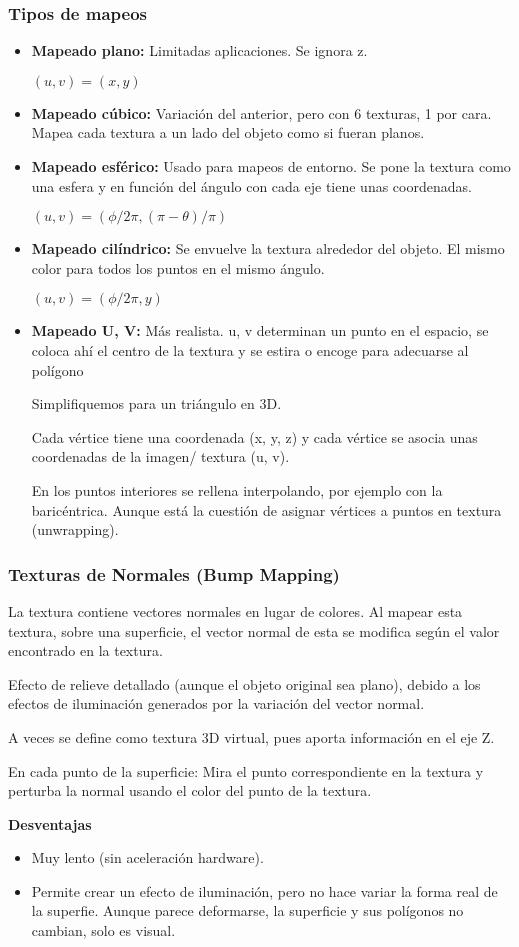 \subsubsection{Tipos de mapeos}
\begin{itemize}
    \item \textbf{Mapeado plano:} Limitadas aplicaciones. Se ignora z. 
    
    $(u, v)=(x, y)$
    \item \textbf{Mapeado cúbico:} Variación del anterior, pero con 6 texturas, 1 por cara. Mapea cada textura a un lado del objeto como si fueran planos.
    \item \textbf{Mapeado esférico:} Usado para mapeos de entorno. Se pone la textura como una esfera y en función del ángulo con cada eje tiene unas coordenadas. 
    
    $(u,v)=(\phi / 2 \pi, (\pi - \theta)/\pi)$
    \item \textbf{Mapeado cilíndrico:} Se envuelve la textura alrededor del objeto. El mismo color para todos los puntos en el mismo ángulo. 
    
    $(u,v)=(\phi / 2 \pi, y)$
    \item \textbf{Mapeado U, V:} Más realista. u, v determinan un punto en el espacio, se coloca ahí el centro de la textura y se estira o encoge para adecuarse al polígono
    
    Simplifiquemos para un triángulo en 3D. 
    
    Cada vértice tiene una coordenada (x, y, z) y cada vértice se asocia unas coordenadas de la imagen/ textura (u, v).

    En los puntos interiores se rellena interpolando, por ejemplo con la baricéntrica. Aunque está la cuestión de asignar vértices  a puntos en textura (unwrapping).
\end{itemize}

\subsubsection{Texturas de Normales (Bump Mapping)} 
La textura contiene vectores normales en lugar de colores. Al mapear esta textura, sobre una superficie, el vector normal de esta se modifica según el valor encontrado en la textura. 

Efecto de relieve detallado (aunque el objeto original sea plano), debido a los efectos de iluminación generados por la variación del vector normal. 

A veces se define como textura 3D virtual, pues aporta información en el eje Z.

En cada punto de la superficie: Mira el punto correspondiente en la textura y perturba la normal usando el color del punto de la textura.

\textbf{Desventajas}
\begin{itemize}
    \item Muy lento (sin aceleración hardware).
    \item Permite crear un efecto de iluminación, pero no hace variar la forma real de la superfie. Aunque parece deformarse, la superficie y sus polígonos no cambian, solo es visual.
\end{itemize}